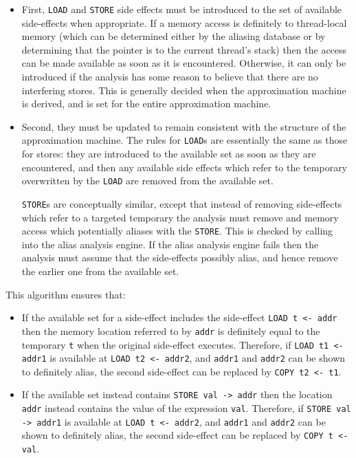 \documentclass[12pt,a4paper]{book}
\begin{document}
\begin{itemize}
\item
  First, \verb|LOAD| and \verb|STORE| side effects must be introduced to the set of available side-effects when appropriate.
  If a memory access is definitely to thread-local memory (which can be determined either by the aliasing database or by determining that the pointer is to the current thread's stack) then the access can be made available as soon as it is encountered.
  Otherwise, it can only be introduced if the analysis has some reason to believe that there are no interfering stores.
  This is generally decided when the approximation machine is derived, and is set for the entire approximation machine.
\item
  Second, they must be updated to remain consistent with the structure of the approximation machine.
  The rules for \verb|LOAD|s are essentially the same as those for stores: they are introduced to the available set as soon as they are encountered, and then any available side effects which refer to the temporary overwritten by the \verb|LOAD| are removed from the available set.

  \verb|STORE|s are conceptually similar, except that instead of removing side-effects which refer to a targeted temporary the analysis must remove and memory access which potentially aliases with the \verb|STORE|.
  This is checked by calling into the alias analysis engine.
  If the alias analysis engine fails then the analysis must assume that the side-effects possibly alias, and hence remove the earlier one from the available set.
\end{itemize}

This algorithm ensures that:

\begin{itemize}
\item
  If the available set for a side-effect includes the side-effect \verb|LOAD t <- addr| then the memory location referred to by \verb|addr| is definitely equal to the temporary \verb|t| when the original side-effect executes.
  Therefore, if \verb|LOAD t1 <- addr1| is available at \verb|LOAD t2 <- addr2|, and \verb|addr1| and \verb|addr2| can be shown to definitely alias, the second side-effect can be replaced by \verb|COPY t2 <- t1|.
\item
  If the available set instead contains \verb|STORE val -> addr| then the location \verb|addr| instead contains the value of the expression \verb|val|.
  Therefore, if \verb|STORE val -> addr1| is available at \verb|LOAD t <- addr2|, and \verb|addr1| and \verb|addr2| can be shown to definitely alias, the second side-effect can be replaced by \verb|COPY t <- val|.
\end{itemize}
\end{document}
